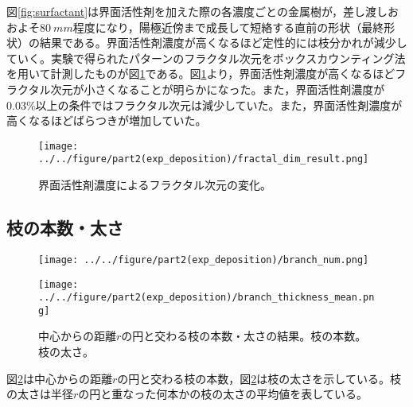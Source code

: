 \documentclass[autodetect-engine,dvi=dvipdfmx,a4paper,ja=standard,oneside,openany,11pt]{bxjsbook}
\begin{document}
図\ref{fig:surfactant}は界面活性剤を加えた際の各濃度ごとの金属樹が，差し渡しおおよそ$\SI{80}{mm}$程度になり，陽極近傍まで成長して短絡する直前の形状（最終形状）の結果である。界面活性剤濃度が高くなるほど定性的には枝分かれが減少していく。実験で得られたパターンのフラクタル次元をボックスカウンティング法を用いて計測したものが図\ref{fig:fractal_dim}である。図\ref{fig:fractal_dim}より，界面活性剤濃度が高くなるほどフラクタル次元が小さくなることが明らかになった。また，界面活性剤濃度が0.03\%以上の条件ではフラクタル次元は減少していた。また，界面活性剤濃度が高くなるほどばらつきが増加していた。
\begin{figure}[htbp]
  \centering
  \texttt{[image: ../../figure/part2(exp\_deposition)/fractal\_dim\_result.png]}
  \caption{界面活性剤濃度によるフラクタル次元の変化。}
  \label{fig:fractal_dim}
\end{figure}

\subsection{枝の本数・太さ}

\begin{figure}[htbp]
  \begin{minipage}
    {0.45\textwidth}
    \subcaption{}
    \centering
    \texttt{[image: ../../figure/part2(exp\_deposition)/branch\_num.png]}
    \label{fig:branch_number}
  \end{minipage}
  \begin{minipage}
    {0.45\textwidth}
    \subcaption{}
    \centering
    \texttt{[image: ../../figure/part2(exp\_deposition)/branch\_thickness\_mean.png]}
    \label{fig:branch_thickness}
  \end{minipage}
  \caption{中心からの距離$r$の円と交わる枝の本数・太さの結果。枝の本数。枝の太さ。}
  \label{fig:branch}
\end{figure}

図\ref{fig:branch}は中心からの距離$r$の円と交わる枝の本数，図\ref{fig:branch}は枝の太さを示している。枝の太さは半径$r$の円と重なった何本かの枝の太さの平均値を表している。
\end{document}
